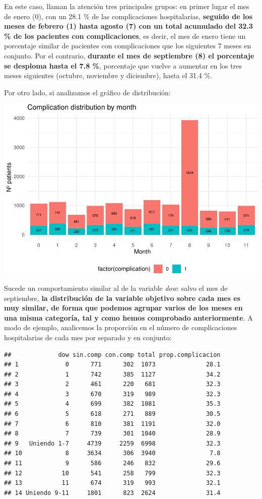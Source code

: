 \documentclass[
]{article}
\begin{document}
En este caso, llaman la atención tres principales grupos: en primer
lugar el mes de enero (0), con un 28.1 \% de las complicaciones
hospitalarias, \textbf{seguido de los meses de febrero (1) hasta agosto
(7) con un total acumulado del 32.3 \% de los pacientes con
complicaciones}, es decir, el mes de enero tiene un porcentaje similar
de pacientes con complicaciones que los siguientes 7 meses en conjunto.
Por el contrario, \textbf{durante el mes de septiembre (8) el porcentaje
se desploma hasta el 7.8 \%}, porcentaje que vuelve a aumentar en los
tres meses siguientes (octubre, noviembre y diciembre), hasta el 31.4
\%.

Por otro lado, si analizamos el gráfico de distribución:

\includegraphics{memoria_files/figure-latex/unnamed-chunk-16-1}

Sucede un comportamiento similar al de la variable \emph{dow}: salvo el
mes de septiembre, \textbf{la distribución de la variable objetivo sobre
cada mes es muy similar, de forma que podemos agrupar varios de los
meses en una misma categoría, tal y como hemos comprobado
anteriormente}. A modo de ejemplo, analicemos la proporción en el número
de complicaciones hospitalarias de cada mes por separado y en conjunto:

\begin{verbatim}
##             dow sin.comp con.comp total prop.complicacion
## 1             0      771      302  1073              28.1
## 2             1      742      385  1127              34.2
## 3             2      461      220   681              32.3
## 4             3      670      319   989              32.3
## 5             4      699      382  1081              35.3
## 6             5      618      271   889              30.5
## 7             6      810      381  1191              32.0
## 8             7      739      301  1040              28.9
## 9   Uniendo 1-7     4739     2259  6998              32.3
## 10            8     3634      306  3940               7.8
## 11            9      586      246   832              29.6
## 12           10      541      258   799              32.3
## 13           11      674      319   993              32.1
## 14 Uniendo 9-11     1801      823  2624              31.4
\end{verbatim}
\end{document}
